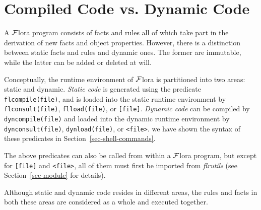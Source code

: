 \documentclass[11pt]{article}
\newcommand{\FLORA}{{\mbox{${\cal F}${\sc lora}}}\xspace}
\begin{document}
\section{Compiled Code vs. Dynamic Code}

A \FLORA program consists of facts and rules all of which take part in the
derivation of new facts and object properties.
However, there is a distinction between static facts and rules and dynamic
ones. The former are immutable, while the latter can be added or deleted at
will.

Conceptually, the runtime environment of \FLORA is partitioned into two
areas: static and dynamic. \emph{Static code} is generated using the
predicate {\tt flcompile(file)}, and is loaded into the static runtime
environment by {\tt flconsult(file)}, {\tt flload(file)}, or {\tt [file]}.
\emph{Dynamic code} can be compiled by {\tt dyncompile(file)} and loaded
into the dynamic runtime environment by {\tt dynconsult(file)},
{\tt dynload(file)}, or \texttt{<file>}.  we have shown the syntax of
these predicates in Section~\ref{sec-shell-commands}.

The above predicates can also be called from within a \FLORA program, but
except for {\tt [file]} and \texttt{<file>}, all of them must first be
imported from \emph{flrutils} (see Section~\ref{sec-module} for details).

Although static and dynamic code resides in different areas, the rules and
facts in both these areas are considered as a whole and executed together.
\end{document}
